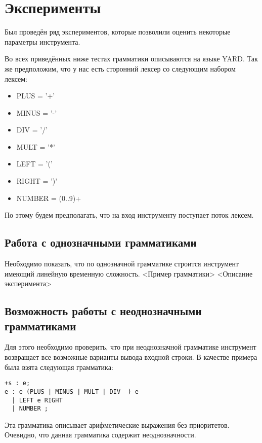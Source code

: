 \section{Эксперименты}

Был проведён ряд экспериментов, которые позволили оценить некоторые параметры инструмента.

Во всех приведённых ниже тестах грамматики описываются на языке YARD. Так же предположим, что у нас есть сторонний лексер со следующим набором лексем:
\begin{itemize}
  \item PLUS = '+'
  \item MINUS = '-'
  \item DIV = '/'
  \item MULT = '*'
  \item LEFT = '('
  \item RIGHT = ')'
  \item NUMBER = (0..9)+
\end{itemize}

По этому будем предполагать, что на вход инструменту поступает поток лексем.


\subsection{Работа с однозначными грамматиками} 

Необходимо показать, что по однозначной грамматике строится инструмент имеющий линейную временную сложность.
	<Пример грамматики> <Описание эксперимента>


\subsection{ Возможность работы с неоднозначными грамматиками} 

Для этого необходимо проверить, что при неоднозначной грамматике инструмент возвращает все возможные варианты вывода входной строки. В качестве примера была взята следующая грамматика:

\begin{verbatim}
+s : e;
e : e (PLUS | MINUS | MULT | DIV  ) e 
  | LEFT e RIGHT 
  | NUMBER ;
\end{verbatim}

Эта грамматика описывает арифметические выражения без приоритетов. Очевидно, что данная грамматика содержит неоднозначности. 

